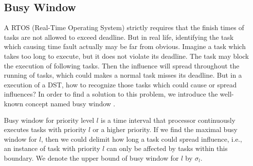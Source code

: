 \documentclass[sigconf]{acmart}
\begin{document}
\subsection{Busy Window}\label{section_busywindow}

A RTOS (Real-Time Operating System) strictly requires that the finish times of tasks are not allowed to exceed deadline. But in real life, identifying the task which causing time fault actually may be far from obvious. Imagine a task which takes too long to execute, but it does not violate its deadline. The task may block the execution of following tasks. Then the influence will spread throughout the running of tasks, which could makes a normal task misses its deadline. But in a execution of a DST, how to recognize those tasks which could cause or spread influences? 
In order to find a solution to this problem, we introduce the well-known concept named busy window \cite{DBLP:conf/rtss/Lehoczky90}. 

Busy window for priority level $l$ is a time interval that processor continuously executes tasks with priority $l$ or a higher priority. If we find the maximal busy window for $l$, then we could delimit how long a task could spread influence, i.e., an instance of task with priority $l$ can only be affected by tasks within this boundary. We denote the upper bound of busy window for $l$ by $\sigma_l$. %
\end{document}
